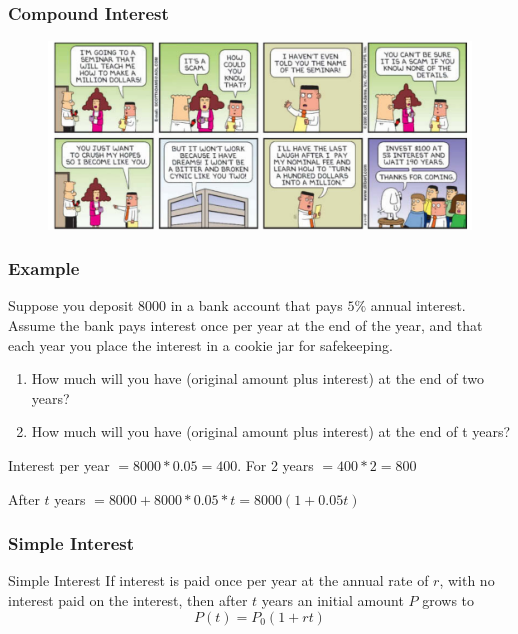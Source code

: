 \documentclass{beamer}
\begin{document}
    \begin{frame}
      \frametitle{Compound Interest}
      \begin{figure}
        \includegraphics[scale=0.3]{CI-comic.png}
      \end{figure}
    \end{frame}

    \begin{frame}
      \frametitle{Example}
      Suppose you deposit \(8000\) in a bank account that pays \(5\%\) annual interest. Assume the bank pays interest once per year at the end of the year, and that each year you place the interest in a cookie jar for safekeeping.
      \begin{enumerate}
        \item  How much will you have (original amount plus interest) at the end of two
        years?
        \item How much will you have (original amount plus interest) at the end of t years?
      \end{enumerate}
      \pause 
      Interest per year \( = 8000*0.05 = 400 \). For 2 years \( = 400*2 = 800\)

      After \(t\) years \(= 8000 + 8000*0.05*t = 8000(1+0.05t)\)
    \end{frame}

    \begin{frame}
      \frametitle{Simple Interest}
      \begin{block}{Simple Interest}
        If interest is paid once per year at the annual rate of \(r\), with no interest paid on the interest, then after \(t\) years 
        an initial amount \(P\) grows to 
        \[
           P(t) = P_{0}(1 + rt) 
        \]
        
      \end{block}
    \end{frame}
\end{document}

